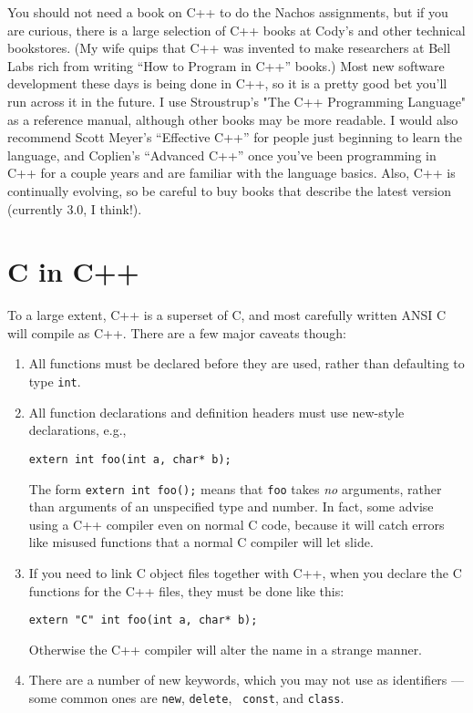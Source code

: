 You should not need a book on C++ to do the Nachos assignments, but if
you are curious, there is a large selection of C++ books
at Cody's and other technical bookstores. (My wife quips that C++ was
invented to make researchers at Bell Labs rich from writing
``How to Program in C++'' books.)   Most new software development
these days is being done in C++, so it is a pretty good bet you'll
run across it in the future.  I use Stroustrup's "The C++
Programming Language" as a reference manual, although other
books may be more readable.  I would also recommend Scott Meyer's
``Effective C++'' for people just beginning to learn the language,
and Coplien's ``Advanced C++'' once you've been programming in C++
for a couple years and are familiar with the language basics.
Also, C++ is continually evolving, so be careful to buy books that describe
the latest version (currently 3.0, I think!).

\section{C in C++}

To a large extent, C++ is a superset of C, and most carefully written
ANSI C will compile as C++.  There are a few major caveats though:

\begin{enumerate}

\item All functions must be declared before they are used, rather than
defaulting to type {\tt int}.

\item All function declarations and definition headers must use
new-style declarations, e.g.,

\begin{verbatim}
extern int foo(int a, char* b);
\end{verbatim}

The form {\tt extern int foo();} means that {\tt foo} takes {\it no}
arguments, rather than arguments of an unspecified type and number.
In fact, some advise using a C++ compiler even
on normal C code, because it will catch errors like misused functions that
a normal C compiler will let slide.

\item If you need to link C object files together with C++, when you
declare the C functions for the C++ files, they must be done like this:

\begin{verbatim}
extern "C" int foo(int a, char* b);
\end{verbatim}

Otherwise the C++ compiler will alter the name in a strange manner.

\item There are a number of new keywords, which you may not use as
identifiers --- some common ones are {\tt new}, {\tt delete}, {\tt
const}, and {\tt class}.

\end{enumerate}

